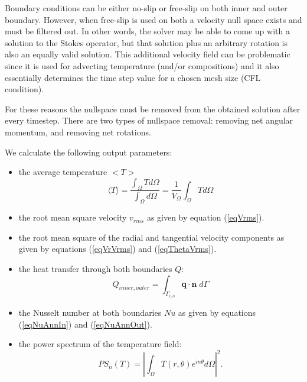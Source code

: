 Boundary conditions can be either no-slip or free-slip on both inner and outer boundary. However, when free-slip 
is used on both a velocity null space exists and must be filtered out. In other words,
the solver may be able to come up with a solution to the Stokes operator, but 
that solution plus an arbitrary rotation is also an equally valid solution.
This additional velocity field can be problematic since it is used for advecting temperature (and/or compositions)
and it also essentially determines the time step value for a chosen mesh size (CFL condition).

For these reasons the nullspace must be removed from the obtained solution after every timestep.
There are two types of nullspace removal: removing net angular momentum, and removing net rotations.




We calculate the following output parameters: 
\begin{itemize}
\item the average temperature $<T>$
\begin{equation}
\langle T \rangle = \frac{\int_\Omega T  d\Omega }{\int_\Omega d \Omega }
=\frac{1}{V_\Omega}\int_\Omega T d\Omega
\end{equation}
\item the root mean square velocity $v_{rms}$ as given by equation (\ref{eqVrms}).
\item the root mean square of the radial and tangential velocity components as given by equations (\ref{eqVrVrms}) and (\ref{eqThetaVrms}).
\item the heat transfer through both boundaries $Q$:
\begin{equation}
Q_{inner, outer} = \int_{\Gamma_{i,o}} \boldsymbol{q} \cdot \boldsymbol{{n}} \; d\Gamma 
\end{equation}
\item the Nusselt number at both boundaries $Nu$ as given by equations (\ref{eqNuAnnIn}) and  (\ref{eqNuAnnOut}). 
\item the power spectrum of the temperature field:
\begin{equation}
PS_n(T) = \left |\int_\Omega T(r, \theta) e^{in\theta} d\Omega \right |^2.
\end{equation}
\end{itemize}








